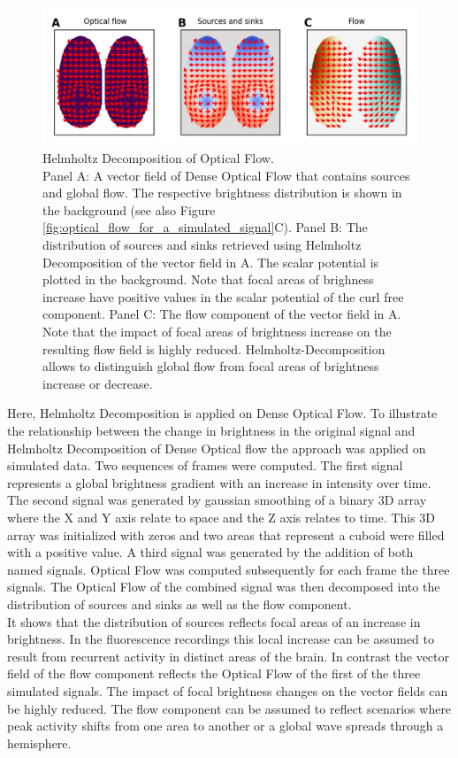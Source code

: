 \begin{figure}[!htb]
\centering
\includegraphics[width=\textwidth,height=\textheight,keepaspectratio]{Figures/helmholtz_decomposition_of_optical_flow_simulation}
\decoRule
\caption[Helmholtz Decomposition of Optical Flow]{Helmholtz Decomposition of Optical Flow.\\ Panel A: A vector field of Dense Optical Flow that contains sources and global flow. The respective brightness distribution is shown in the background (see also Figure \ref{fig:optical_flow_for_a_simulated_signal}C). Panel B: The distribution of sources and sinks retrieved using Helmholtz Decomposition of the vector field in A. The scalar potential is plotted in the background. Note that focal areas of brighness increase have positive values in the scalar potential of the curl free component. Panel C: The flow component of the vector field in A. Note that the impact of focal areas of brightness increase on the resulting flow field is highly reduced. Helmholtz-Decomposition allows to distinguish global flow from focal areas of brightness increase or decrease.}
\label{fig:helmholtz_decomposition_of_optical_flow_simulation}
\end{figure}
Here, Helmholtz Decomposition is applied on Dense Optical Flow. To illustrate the relationship between the change in brightness in the original signal and Helmholtz Decomposition of Dense Optical flow the approach was applied on simulated data. Two sequences of frames were computed. The first signal represents a global brightness gradient with an increase in intensity over time. The second signal was generated by gaussian smoothing of a binary 3D array where the X and Y axis relate to space and the Z axis relates to time. This 3D array was initialized with zeros and two areas that represent a cuboid were filled with a positive value. A third signal was generated by the addition of both named signals. Optical Flow was computed subsequently for each frame the three signals. The Optical Flow of the combined signal was then decomposed into the distribution of sources and sinks as well as the flow component.\\
It shows that the distribution of sources reflects focal areas of an increase in brightness. In the fluorescence recordings this local increase can be assumed to result from recurrent activity in distinct areas of the brain. In contrast the vector field of the flow component reflects the Optical Flow of the first of the three simulated signals. The impact of focal brightness changes on the vector fields can be highly reduced. The flow component can be assumed to reflect scenarios where peak activity shifts from one area to another or a global wave spreads through a hemisphere.

